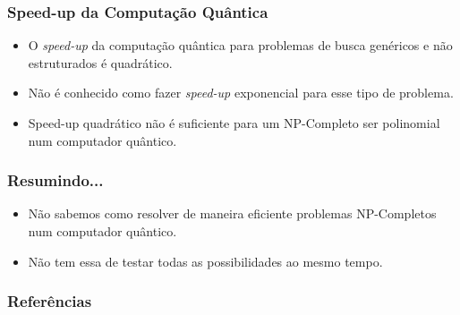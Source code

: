 \documentclass{beamer}
\begin{document}
\begin{frame}
\frametitle{Speed-up da Computação Quântica} 
\begin{itemize}
  \item O \textit{speed-up} da computação quântica para problemas de
    busca genéricos e não estruturados é quadrático.
  \item Não é conhecido como fazer \textit{speed-up} exponencial para esse tipo de problema.
  \item Speed-up quadrático não é suficiente para um NP-Completo ser polinomial num computador
    quântico.
\end{itemize}
\end{frame}

\begin{frame}
  \frametitle{Resumindo...}
  \begin{itemize}
  \item Não sabemos como resolver de maneira eficiente problemas
    NP-Completos num computador quântico. 
  \item Não tem essa de testar todas as possibilidades ao mesmo tempo.
  \end{itemize}
\end{frame}

\begin{frame}
  \frametitle{Referências}
   
  
\end{frame}
\end{document}
